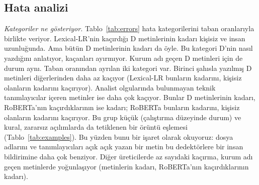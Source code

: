 \documentclass[journal]{IEEEtran}
\begin{document}




\subsection{Hata analizi}\label{sec:erranalysis}
\emph{Kategoriler ne gösteriyor.} Tablo~\ref{tab:errors} hata kategorilerini taban oranlarıyla birlikte veriyor.
Lexical-LR'nin kaçırdığı D metinlerinin \ErrFnDImpersonalHumanLengthLexlr{} kadarı kişisiz ve insan uzunluğunda.
Ama bütün D metinlerinin \ErrbaseFnDImpersonalHumanLength{} kadarı da öyle. Bu kategori D'nin nasıl yazdığını
anlatıyor, kaçanları ayırmıyor. Kurum adı geçen D metinleri için de durum aynı. Taban oranından ayrılan iki
kategori var. Birinci şahısla yazılmış D metinleri diğerlerinden daha az kaçıyor (Lexical-LR bunların
\ErrRateFnDFirstPersonStillMissedLexlr{} kadarını, kişisiz olanların \ErrRateFnDImpersonalHumanLengthLexlr{}
kadarını kaçırıyor). Analist olgularında bulunmayan teknik tanımlayıcılar içeren metinler ise daha çok kaçıyor.
Bunlar D metinlerinin \ErrbaseFnDUnsupportedTechnicalDetail{} kadarı, RoBERTa'nın kaçırdıklarının ise
\ErrFnDUnsupportedTechnicalDetailTrans{} kadarı; RoBERTa bunların \ErrRateFnDUnsupportedTechnicalDetailTrans{}
kadarını, kişisiz olanların \ErrRateFnDImpersonalHumanLengthTrans{} kadarını kaçırıyor. Bu grup küçük
(çalıştırma düzeyinde \ErrNFnDUnsupportedTechnicalDetailLexlr{} durum) ve kural, zararsız açılımlarda da tetiklenen
bir örüntü eşlemesi (Tablo~\ref{tab:examples}). Bu yüzden bunu bir işaret olarak okuyoruz: dosya adlarını ve
tanımlayıcıları açık açık yazan bir metin bu dedektörlere bir insan bildirimine daha çok benziyor. Diğer
üreticilerde az sayıdaki kaçırma, kurum adı geçen metinlerde yoğunlaşıyor (metinlerin
\ErrbaseFnOtherGeneratorsCitesAnAgency{} kadarı, RoBERTa'nın kaçırdıklarının
\ErrFnOtherGeneratorsCitesAnAgencyTrans{} kadarı).
\end{document}
